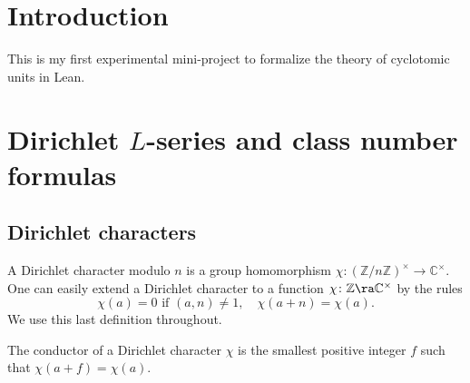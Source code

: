 
%

\chapter{Introduction}
This is my first experimental mini-project 
to formalize the theory of cyclotomic units in Lean. 


\chapter{Dirichlet $L$-series and class number formulas}\label{chap:dirichlet}

\section{Dirichlet characters}

\begin{definition}\label{defn:dirichlet_character}
    \leanok
    A Dirichlet character modulo $n$ is a group homomorphism $\chi \colon (\mathbb{Z} / n \mathbb{Z})^\times \to \mathbb{C}^\times$. One can easily extend a Dirichlet character 
    to a function $\chi \colon \mathbb{Z} \ra \mathbb{C}^\times$ by the rules 
    $$
    \chi(a) = 0 \text{ if } (a, n) \ne 1, \quad \chi(a + n) = \chi(a).
    $$
    We use this last definition throughout.
\end{definition}


\begin{definition}\label{defn:conductor_dirchar}
    \leanok
    The conductor of a Dirichlet character $\chi$ is the smallest positive integer $f$ such that $\chi(a + f) = \chi(a)$.
\end{definition}

